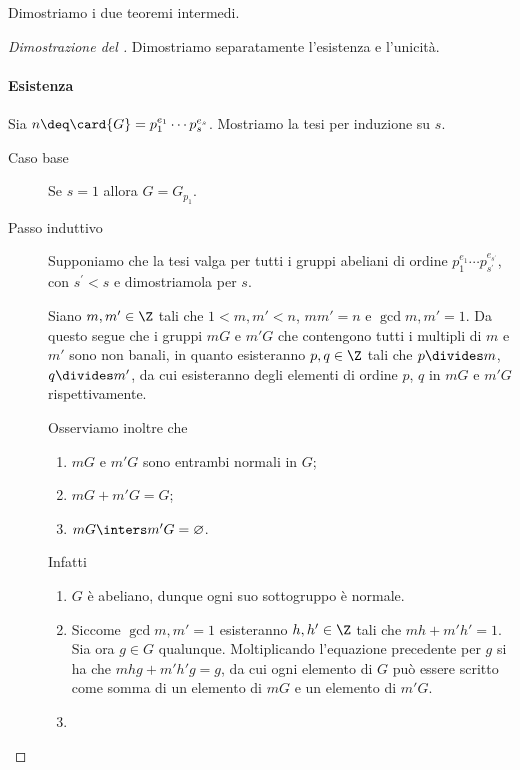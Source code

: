 Dimostriamo i due teoremi intermedi.
\begin{proof}
    [Dimostrazione del ]
    Dimostriamo separatamente l'esistenza e l'unicità.
    \paragraph{Esistenza} Sia $n \deq \card{G} = p_1^{e_1}\cdots p_s^{e_s}$. Mostriamo la tesi per induzione su $s$.
    \begin{description}
        \item[Caso base] Se $s = 1$ allora $G = G_{p_1}$.
        \item[Passo induttivo] Supponiamo che la tesi valga per tutti i gruppi abeliani di ordine $p_1^{e_1}\cdots p_{s^\prime}^{e_{s^\prime}}$, con $s^\prime < s$ e dimostriamola per $s$.
        
        Siano $m, m' \in \Z$ tali che $1 < m, m' < n$, $mm' = n$ e $\gcd{m, m'} = 1$. Da questo segue che i gruppi $mG$ e $m'G$ che contengono tutti i multipli di $m$ e $m'$ sono non banali, in quanto esisteranno $p, q \in \Z$ tali che $p \divides m$, $q \divides m'$, da cui esisteranno degli elementi di ordine $p$, $q$ in $mG$ e $m'G$ rispettivamente.
        
        Osserviamo inoltre che \begin{enumerate}
            \item $mG$ e $m'G$ sono entrambi normali in $G$;
            \item $mG + m'G = G$;
            \item $mG \inters m'G = \varnothing$.
        \end{enumerate}
        Infatti \begin{enumerate}
            \item $G$ è abeliano, dunque ogni suo sottogruppo è normale.
            \item Siccome $\gcd{m, m'} = 1$ esisteranno $h, h' \in \Z$ tali che $mh + m'h' = 1$. Sia ora $g \in G$ qualunque. Moltiplicando l'equazione precedente per $g$ si ha che $mhg + m'h'g = g$, da cui ogni elemento di $G$ può essere scritto come somma di un elemento di $mG$ e un elemento di $m'G$.
            \item 
        \end{enumerate}
    \end{description}
\end{proof}